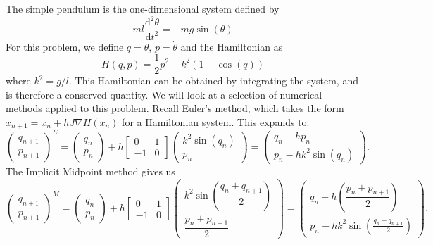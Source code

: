 The simple pendulum is the one-dimensional system defined by
\begin{equation*}
	ml\frac{\mathrm{d}^2 \theta}{\mathrm{d}t^2} = - mg \sin(\theta)
\end{equation*}
For this problem, we define $q = \theta$, $p = \dot{\theta}$ and the Hamiltonian \cite{Casas_2016} as
\begin{equation*}
	H(q,p) = \frac{1}{2}p^2 + k^2(1-\cos(q))
\end{equation*}
where $k^2 = g/l$.
This Hamiltonian can be obtained by integrating the system, and is therefore a conserved quantity.
We will look at a selection of numerical methods applied to this problem.
Recall Euler's method, which takes the form $x_{n+1} = x_n + h {J} \nabla H(x_n)$ for a Hamiltonian system.
This expands to:
\begin{equation*}
	\begin{pmatrix}
		q_{n+1} \\
		p_{n+1}
	\end{pmatrix}^E = \begin{pmatrix}
		q_n \\
		p_n
	\end{pmatrix} + h \begin{bmatrix}
		0 & 1 \\
		-1 & 0
	\end{bmatrix} \begin{pmatrix}
		k^2 \sin(q_n) \\
		p_n
	\end{pmatrix} = \begin{pmatrix}
		q_n + h p_n \\
		p_n - h k^2 \sin(q_n)
	\end{pmatrix}.
\end{equation*}
The Implicit Midpoint method gives us
\begin{equation*}
	\begin{pmatrix}
		q_{n+1} \\
		p_{n+1}
	\end{pmatrix}^M = \begin{pmatrix}
		q_n \\
		p_n
	\end{pmatrix} + h \begin{bmatrix}
		0 & 1 \\
		-1 & 0
	\end{bmatrix} \begin{pmatrix}
		k^2 \sin \left(\dfrac{q_n + q_{n+1}}{2}\right) \\
		\dfrac{p_n + p_{n+1}}{2}
	\end{pmatrix} = \begin{pmatrix}
		q_n + h \left( \dfrac{p_n + p_{n+1}}{2} \right) \\
		p_n - h k^2 \sin \left( \frac{q_n + q_{n+1}}{2} \right)
	\end{pmatrix}.
\end{equation*}
